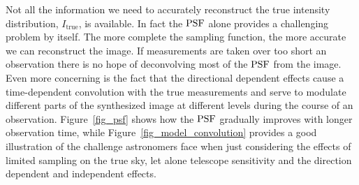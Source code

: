 Not all the information we need to accurately reconstruct the true intensity distribution, $I_{\text{true}}$, is available. In fact the $\textrm{PSF}$ alone provides a challenging
problem by itself. The more complete the sampling function, the more accurate we can reconstruct the image. If measurements are taken over too short an observation there is
no hope of deconvolving most of the $\textrm{PSF}$ from the image. Even more concerning is the fact that the directional dependent effects cause a time-dependent convolution with the
true measurements and serve to modulate different parts of the synthesized image at different levels during the course of an observation. Figure~\ref{fig_psf} shows how the 
$\textrm{PSF}$ gradually improves with longer observation time, while Figure~\ref{fig_model_convolution} provides a good illustration of the challenge astronomers face 
when just considering the effects of limited sampling on the true sky, let alone telescope sensitivity and the direction dependent and independent effects.
